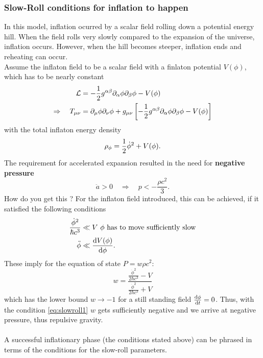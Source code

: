 \subsubsection{Slow-Roll conditions for inflation to happen}
In this model, inflation ocurred by a scalar field rolling down a potential energy hill. When the field rolls very slowly compared to the expansion of the universe, inflation occurs. However, when the hill becomes steeper, inflation ends and reheating can occur.\\
Assume the inflaton field to be a scalar field with a finlaton potential $V(\phi)$, which has to be nearly constant
\begin{align}
	\mathcal{L} &= - \frac{1}{2} g^{\alpha \beta} \partial_\alpha \phi \partial_\beta \phi - V(\phi) \\
	\Rightarrow \quad T_{\mu \nu}&=\partial_\mu \phi \partial_\nu \phi+g_{\mu \nu} \left[-\frac{1}{2} g^{\alpha \beta} \partial_\alpha \phi \partial_\beta \phi - V(\phi)\right]
\end{align}
with the total inflaton energy density
\begin{equation}
	\rho_\phi = \frac{1}{2} \dot{\phi}^2 + V(\phi).
\end{equation}
The requirement for accelerated expansion resulted in the need for \textbf{negative pressure} 
\begin{equation}
\ddot{a} >0 \quad \Rightarrow \quad p < -\frac{\rho c^2}{3}.
\end{equation}
How do you get this ? For the inflaton field introduced, this can be achieved, if it satisfied the following conditions
\begin{align}
	\frac{\dot{\phi}^2}{\hbar c^3} & \ll V \text{ $\phi$ has to move sufficiently slow}\label{eq:slowroll1}\\
	\ddot{\phi} & \ll \frac{\mathrm{d} V(\phi)}{\mathrm{d} \phi}.\label{eq:slowroll2}
\end{align}
These imply for the equation of state $P = w \rho  c^2$:
\begin{equation}
	w= \frac{\frac{\dot{\phi}^2}{2 \hbar c^3} -  V}{\frac{\dot{\phi}^2}{2 \hbar c^3} + V}
\end{equation}
which has the lower bound $w\rightarrow -1 $ for a still standing field $\frac{\mathrm{d} \phi}{\mathrm{d} t}=0$. Thus, with the condition \ref{eq:slowroll1} $w$ gets sufficiently negative and we arrive at negative pressure, thus repulsive gravity.\\
\\
A successful inflationary phase (the conditions stated above) can be phrased in terms of the conditions for the slow-roll parameters.
